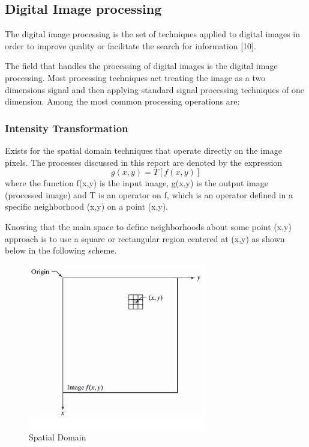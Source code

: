 \subsection{Digital Image processing}
The digital image processing is the set of techniques applied to digital images in order to improve quality or facilitate the search for information [10].

The field that handles the processing of digital images is the digital image processing. Most processing techniques act treating the image as a two dimensions signal and then applying standard signal processing techniques of one dimension. Among the most common processing
operations are:
\subsubsection{Intensity Transformation}
Exists for the spatial domain techniques that operate directly on the image pixels. The processes discussed in this report are denoted by the expression
\begin{equation}
	 g(x,y) = T[f(x,y)]
\end{equation}
where the function f(x,y) is the input image, g(x,y) is the output image (processed image) and T is an operator on f, which is an operator defined in a specific neighborhood (x,y) on a point (x,y).

Knowing that the main space to define neighborhoods about some point (x,y) approach is to use a square or rectangular region centered at (x,y) as shown below in the following scheme.

\begin{figure}
	\centering
		\includegraphics[scale=1]{images/ch2/spatialDomain.jpg}
		\caption{Spatial Domain}
		\label{fig:spatialDomain}
\end{figure}

